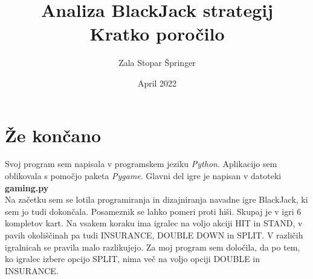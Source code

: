 \documentclass[a4paper, 16pt]{article}
\title{Analiza BlackJack strategij \\ Kratko poročilo}
\date{April 2022}
\author{Zala Stopar Špringer}
\begin{document}
\maketitle

\section{Že končano}

Svoj program sem napisala v programskem jeziku \textit{Python}. Aplikacijo sem oblikovala s pomočjo paketa \textit{Pygame}. Glavni del igre je napisan v datoteki \textbf{gaming.py}\\

\noindent Na začetku sem se lotila programiranja in dizajniranja navadne igre BlackJack, ki sem jo tudi dokončala. Posameznik se lahko pomeri proti hiši. Skupaj je v igri 6 kompletov kart. Na vsakem koraku ima igralec na voljo akciji HIT in STAND, v pavih okoliščinah pa tudi INSURANCE, DOUBLE DOWN in SPLIT. V različih igralnicah se pravila malo razlikujejo. Za moj program sem določila, da po tem, ko igralec izbere opcijo SPLIT, nima več na voljo opciji DOUBLE in INSURANCE. \\
\end{document}
